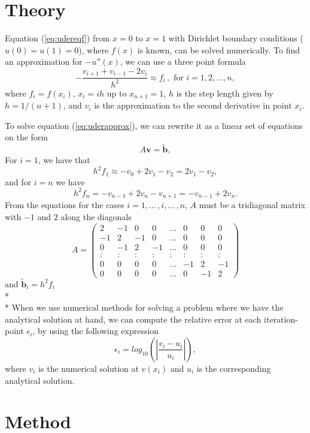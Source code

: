\documentclass[norsk,a4paper,12pt]{article}
\begin{document}
\section{Theory}
Equation (\ref{eq:udereqf}) from $x=0$ to $x=1$ with Dirichlet boundary conditions ($u(0)=u(1)=0$), where $f(x)$ is known, can be solved numerically. To find an approximation for $-u''(x)$, we can use a three point formula
\begin{equation}
-\frac{v_{i+1}+v_{i-1} - 2v_i}{h^2} \approx f_i\, , \text{ for } i = 1, 2, ..., n,
\label{eq:uderapprox}
\end{equation}
where $f_i=f(x_i)$, $x_i = ih$ up to $x_{n+1} = 1$, $h$ is the step length given by $h=1/(n+1)$, and $v_i$ is the approximation to the second derivative in point $x_i$. 

To solve equation (\ref{eq:uderapprox}), we can rewrite it as a linear set of equations on the form \begin{equation}
A\textbf{v} = \tilde{\textbf{b}},
\label{eq:Aveqb}
\end{equation} For $i=1$, we have that 
$$h^2f_1 \approx -v_0 + 2v_1 - v_2 = 2v_1-v_2,$$
and for $i=n$ we have 
$$h^2f_n = -v_{n-1} + 2v_n - v_{n+1} = -v_{n-1} + 2v_n.$$ From the equations for the cases $i=1,...\,,i,...\,,n$, $A$ must be a tridiagonal matrix with $-1$ and $2$ along the diagonals
$$A = \begin{pmatrix}
2&-1&0&0&...&0&0&0\\
-1&2&-1&0&...&0&0&0\\
0&-1&2&-1&...&0&0&0\\
:&:&:&:& : &:&:&:\\
0&0&0&0&...&-1&2&-1\\
0&0&0&0&...&0&-1&2
\end{pmatrix}$$
and $\tilde{\textbf{b}}_i = h^2f_i$
\\* \\* \noindent
When we use numerical methods for solving a problem where we have the analytical solution at hand, we can compute the relative error at each iteration-point $\epsilon _i$, by using the following expression
\begin{equation}
\epsilon _i = log_{10}\left(\left|\frac{v_i-u_i}{u_i}\right|\right),
\label{epsilon_i}
\end{equation}
where $v_i$ is the numerical solution at $v(x_i)$ and $u_i$ is the corresponding analytical solution. 
\section{Method}
\end{document}
